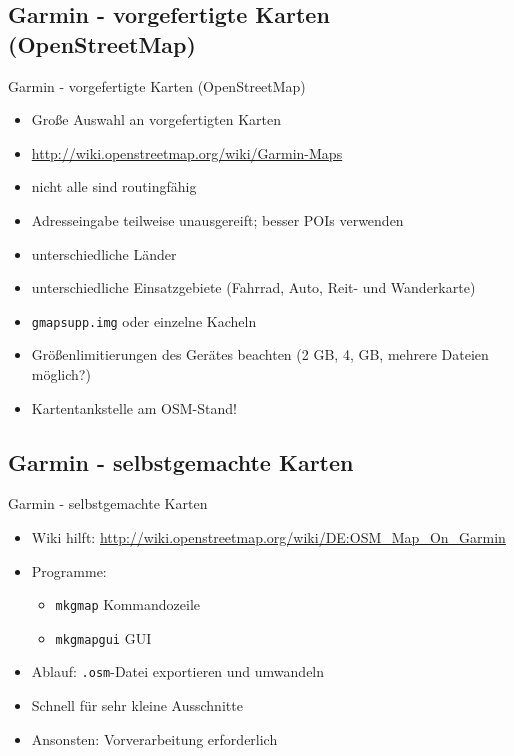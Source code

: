 \documentclass{beamer}
\begin{document}
\subsection{Garmin - vorgefertigte Karten (OpenStreetMap)}
\begin{frame}
Garmin - vorgefertigte Karten (OpenStreetMap)
\begin{itemize}
  \item Große Auswahl an vorgefertigten Karten
  \item \url{http://wiki.openstreetmap.org/wiki/Garmin-Maps}
  \item nicht alle sind routingfähig
  \item Adresseingabe teilweise unausgereift; besser POIs verwenden
  \item unterschiedliche Länder
  \item unterschiedliche Einsatzgebiete (Fahrrad, Auto, Reit- und
    Wanderkarte)
  \item \texttt{gmapsupp.img} oder einzelne Kacheln
  \item Größenlimitierungen des Gerätes beachten (2 GB, 4, GB, mehrere
    Dateien möglich?)
  \item Kartentankstelle am OSM-Stand!
\end{itemize}
\end{frame}

\subsection{Garmin - selbstgemachte Karten}
\begin{frame}
  Garmin - selbstgemachte Karten
  \begin{itemize}
    \item Wiki hilft:
      \url{http://wiki.openstreetmap.org/wiki/DE:OSM_Map_On_Garmin}
    \item Programme:
    \begin{itemize}
      \item \texttt{mkgmap} Kommandozeile
      \item \texttt{mkgmapgui} GUI
    \end{itemize}
    \item Ablauf: \texttt{.osm}-Datei exportieren und umwandeln
    \item Schnell für sehr kleine Ausschnitte
    \item Ansonsten: Vorverarbeitung erforderlich
  \end{itemize}
\end{frame}
\end{document}
